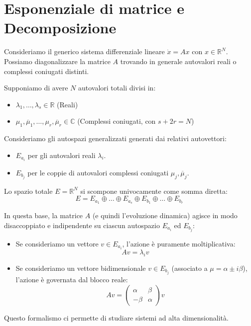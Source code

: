 \documentclass[openany]{book}
\theoremstyle{definition}
\theoremstyle{remark}
\begin{document}
\section{Esponenziale di matrice e Decomposizione}


Consideriamo il generico sistema differenziale lineare $\dot{x} = Ax$ con $x \in \mathbb{R}^N$.
Possiamo diagonalizzare la matrice $A$ trovando in generale autovalori reali o complessi coniugati distinti.

Supponiamo di avere $N$ autovalori totali divisi in:
\begin{itemize}
    \item $\lambda_1, \dots, \lambda_s \in \mathbb{R}$ (Reali)
    \item $\mu_1, \overline{\mu}_1, \dots, \mu_r, \overline{\mu}_r \in \mathbb{C}$ (Complessi coniugati, con $s + 2r = N$)
\end{itemize}

Consideriamo gli autospazi generalizzati generati dai relativi autovettori:
\begin{itemize}
    \item $E_{a_i}$ per gli autovalori reali $\lambda_i$.
    \item $E_{b_j}$ per le coppie di autovalori complessi coniugati $\mu_j, \overline{\mu}_j$.
\end{itemize}

Lo spazio totale $E = \mathbb{R}^N$ si scompone univocamente come somma diretta:
\begin{equation}
    E = E_{a_1} \oplus \dots \oplus E_{a_s} \oplus E_{b_1} \oplus \dots \oplus E_{b_r}
\end{equation}

In questa base, la matrice $A$ (e quindi l'evoluzione dinamica) agisce in modo disaccoppiato e indipendente su ciascun autospazio $E_{a_i}$ ed $E_{b_j}$:
\begin{itemize}
    \item Se consideriamo un vettore $v \in E_{a_i}$, l'azione è puramente moltiplicativa: 
    \begin{equation*}
        Av = \lambda_i v
    \end{equation*}
    \item Se consideriamo un vettore bidimensionale $v \in E_{b_j}$ (associato a $\mu = \alpha \pm i\beta$), l'azione è governata dal blocco reale:
    \begin{equation*}
        Av = \begin{pmatrix} \alpha & \beta \\ -\beta & \alpha \end{pmatrix} v
    \end{equation*}
\end{itemize}
Questo formalismo ci permette di studiare sistemi ad alta dimensionalità.
\end{document}
